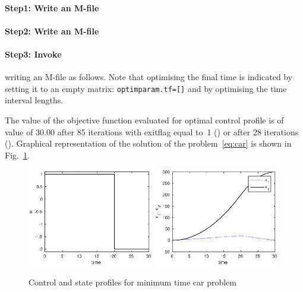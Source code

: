 \paragraph{Step1: Write an M-file~}

{\small }

\paragraph{Step2: Write an M-file~}

{\small }

\paragraph{Step3: Invoke~} writing an M-file
 as follows. Note that optimising the final time is
indicated by setting it to an empty matrix: \verb+optimparam.tf=[]+
and by optimising the time interval lengths. 

{\small }

The value of the objective function evaluated for optimal control
profile is of value of 30.00 after 85 iterations with exitflag equal
to~1 () or after 28 iterations (). Graphical
representation of the solution of the problem~\eqref{eq:car} is shown
in Fig.~\ref{fig:car}.

\begin{figure}[htb]
\includegraphics[width=0.49\textwidth]{examples/problem-car/car_u.eps}
\includegraphics[width=0.49\textwidth]{examples/problem-car/car_x.eps}
\caption{Control and state profiles for minimum time car
  problem} \label{fig:car}
\end{figure}

